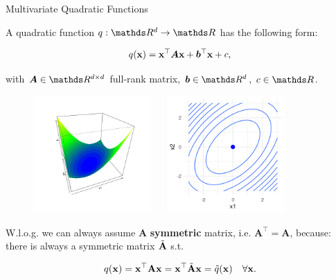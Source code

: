   \begin{vbframe}{Multivariate Quadratic Functions}
  
  A quadratic function $q: \R^d \to \R$ has the following form: 
  
  $$
    q(\mathbf{x}) = \mathbf{x}^\top \bm{A} \mathbf{x} + \bm{b}^\top \mathbf{x} + c,
  $$
  
  with $\bm{A} \in \R^{d \times d}$ full-rank matrix, $\bm{b} \in \R^d$, $c \in \R$. %
  
  \begin{figure}
    \includegraphics[height=0.4\textwidth, width = 0.4\textwidth]{figure_man/quadratic_functions_2D_example_1_1.png} ~~ \includegraphics[height=0.4\textwidth, width = 0.4\textwidth]{figure_man/quadratic_functions_2D_example_1_2.png}\\
    \begin{footnotesize} 
    \end{footnotesize}
  \end{figure}
  
  \framebreak 
  
  
  W.l.o.g. we can always assume $\bm{A}$ \textbf{symmetric} matrix, i.e. $\bm{A}^\top = \bm{A}$, because: there is always a symmetric matrix $\tilde {\mathbf{A}}$ s.t. 
  
  \vspace*{-0.3cm}
  
  \begin{eqnarray*}
    q(\mathbf{x}) = \mathbf{x}^\top \mathbf{A} \mathbf{x} = \mathbf{x}^\top \tilde {\mathbf{A}} \mathbf{x} = \tilde q(\mathbf{x}) \quad \forall \mathbf{x}.
  \end{eqnarray*}
  

\end{vbframe}

